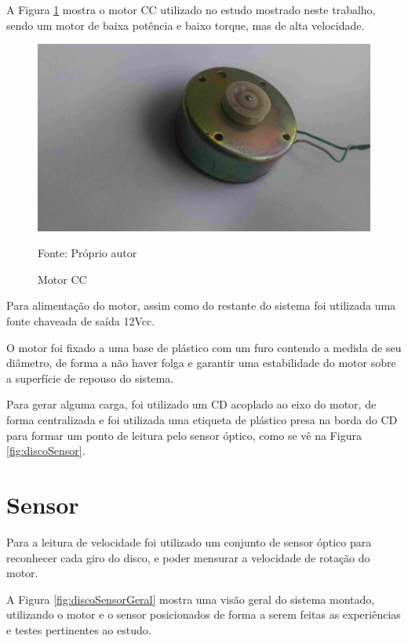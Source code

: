 A Figura  \ref{fig:motorDC} mostra o motor CC utilizado no estudo mostrado neste trabalho, 
sendo um motor de baixa potência e baixo torque, mas de alta velocidade. 


\begin{figure}[!htb]
\caption{Motor CC}
\center\includegraphics[scale=0.1, angle=0, clip=true, trim=1500 500 400 200]{./imagens/motorDC.jpg}
\label{fig:motorDC}

{\small Fonte: Próprio autor}
\end{figure}

Para alimentação do motor, 
assim como do restante do sistema foi utilizada uma fonte chaveada de saída 12Vcc.


O motor foi fixado a uma base de plástico com um furo contendo a medida de seu diâmetro, 
de forma a não haver folga e garantir uma estabilidade do motor 
sobre a superfície de repouso do sistema.

Para gerar alguma carga, 
foi utilizado um CD acoplado ao eixo do motor, de forma centralizada 
e foi utilizada uma etiqueta de plástico presa na borda do CD %
para formar um ponto de leitura pelo sensor óptico, 
como se vê na Figura \ref{fig:discoSensor}.

\section{Sensor}

Para a leitura de velocidade foi utilizado 
um conjunto de sensor óptico para reconhecer cada giro do disco, 
e poder mensurar a velocidade de rotação do motor.

A Figura \ref{fig:discoSensorGeral} mostra uma visão geral do sistema montado, 
utilizando o motor e o sensor posicionados de 
forma a serem feitas as experiências e testes pertinentes ao estudo.

